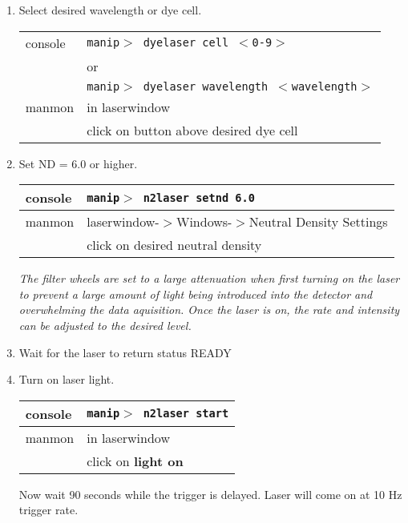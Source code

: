 \begin{enumerate}
 \item\checkbox  Select desired wavelength or dye cell.
  \begin{center}
  \begin{tabular}{|l|l|}
  \hline
  console & {\tt manip$>$ dyelaser cell $<$0-9$>$} \\
          & or \\
          & {\tt manip$>$ dyelaser wavelength $<$wavelength$>$}\\
  \hline
  manmon  & in laserwindow \\
          & click on button above desired dye cell\\
  \hline
  \end{tabular}
  \end{center}
 \item\checkbox Set ND = 6.0 or higher.
  \begin{center}
  \begin{tabular}{|l|l|}
  \hline
  console & {\tt manip$>$ n2laser setnd 6.0} \\
  \hline
  manmon  & laserwindow-$>$Windows-$>$Neutral Density Settings \\
          & click on desired neutral density\\
  \hline
  \end{tabular}
  \end{center}
  \small
  {\em
    The filter wheels are set to a large attenuation when first turning
    on the laser to prevent a large amount of light being introduced 
    into the detector and overwhelming the data aquisition.  Once
    the laser is on, the rate and intensity can be adjusted to the
    desired level.
  }
  \normalsize


  \item\checkbox Wait for the laser to return status READY

 \item\checkbox Turn on laser light.
  \begin{center}
  \begin{tabular}{|l|l|}
  \hline
  console & {\tt manip$>$ n2laser start} \\
  \hline
  manmon  & in laserwindow \\
          & click on {\bf light on}\\
  \hline
  \end{tabular}
  \end{center}
   Now wait 90 seconds while the trigger is delayed.
   Laser will come on at 10 Hz trigger rate.
  

\end{enumerate}
